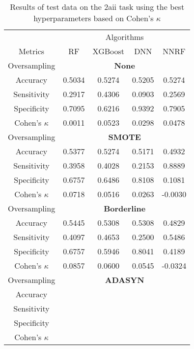\begin{table}[!htb]
\centering
\caption{Results of test data on the 2aii task using the best hyperparameters based on Cohen's $\kappa$}
\label{tab:2aii_test_results}
\begin{tabular}{c | c c c c}
\hline
 & \multicolumn{4}{c}{Algorithms}\\ 
Metrics &RF & XGBoost & DNN & NNRF\\ 
\hline
Oversampling &\multicolumn{4}{|c}{\textbf{None}}\\ 
\hline
Accuracy & 0.5034 & 0.5274 & 0.5205 & 0.5274\\ 
Sensitivity & 0.2917 & 0.4306 & 0.0903 & 0.2569\\ 
Specificity & 0.7095 & 0.6216 & 0.9392 & 0.7905\\ 
Cohen's $\kappa$ & 0.0011 & 0.0523 & 0.0298 & 0.0478\\ 
\hline
Oversampling &\multicolumn{4}{|c}{\textbf{SMOTE}}\\ 
\hline
Accuracy & 0.5377 & 0.5274 & 0.5171 & 0.4932\\ 
Sensitivity & 0.3958 & 0.4028 & 0.2153 & 0.8889\\ 
Specificity & 0.6757 & 0.6486 & 0.8108 & 0.1081\\ 
Cohen's $\kappa$ & 0.0718 & 0.0516 & 0.0263 & -0.0030\\ 
\hline
Oversampling &\multicolumn{4}{|c}{\textbf{Borderline}}\\ 
\hline
Accuracy & 0.5445 & 0.5308 & 0.5308 & 0.4829\\ 
Sensitivity & 0.4097 & 0.4653 & 0.2500 & 0.5486\\ 
Specificity & 0.6757 & 0.5946 & 0.8041 & 0.4189\\ 
Cohen's $\kappa$ & 0.0857 & 0.0600 & 0.0545 & -0.0324\\ 
\hline
Oversampling &\multicolumn{4}{|c}{\textbf{ADASYN}}\\ 
\hline
Accuracy &  &  &  & \\ 
Sensitivity &  &  &  & \\ 
Specificity &  &  &  & \\ 
Cohen's $\kappa$ &  &  &  & \\ 
\hline
\end{tabular}
\end{table}


